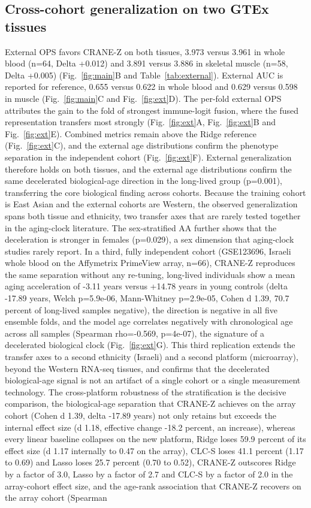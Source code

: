 \documentclass[unnumsec,webpdf,contemporary,large]{oup-authoring-template}
\begin{document}
\subsection{Cross-cohort generalization on two GTEx tissues}\label{sec:res3}
External OPS favors CRANE-Z on both tissues, 3.973 versus 3.961 in whole blood (n=64, Delta +0.012) and 3.891 versus 3.886 in skeletal muscle (n=58, Delta +0.005) (Fig.~\ref{fig:main}B and Table~\ref{tab:external}). External AUC is reported for reference, 0.655 versus 0.622 in whole blood and 0.629 versus 0.598 in muscle (Fig.~\ref{fig:main}C and Fig.~\ref{fig:ext}D). The per-fold external OPS attributes the gain to the fold of strongest immune-logit fusion, where the fused representation transfers most strongly (Fig.~\ref{fig:ext}A, Fig.~\ref{fig:ext}B and Fig.~\ref{fig:ext}E). Combined metrics remain above the Ridge reference (Fig.~\ref{fig:ext}C), and the external age distributions confirm the phenotype separation in the independent cohort (Fig.~\ref{fig:ext}F). External generalization therefore holds on both tissues, and the external age distributions confirm the same decelerated biological-age direction in the long-lived group (p=0.001), transferring the core biological finding across cohorts. Because the training cohort is East Asian and the external cohorts are Western, the observed generalization spans both tissue and ethnicity, two transfer axes that are rarely tested together in the aging-clock literature. The sex-stratified AA further shows that the deceleration is stronger in females (p=0.029), a sex dimension that aging-clock studies rarely report. In a third, fully independent cohort (GSE123696, Israeli whole blood on the Affymetrix PrimeView array, n=66), CRANE-Z reproduces the same separation without any re-tuning, long-lived individuals show a mean aging acceleration of -3.11 years versus +14.78 years in young controls (delta -17.89 years, Welch p=5.9e-06, Mann-Whitney p=2.9e-05, Cohen d 1.39, 70.7 percent of long-lived samples negative), the direction is negative in all five ensemble folds, and the model age correlates negatively with chronological age across all samples (Spearman rho=-0.569, p=4e-07), the signature of a decelerated biological clock (Fig.~\ref{fig:ext}G). This third replication extends the transfer axes to a second ethnicity (Israeli) and a second platform (microarray), beyond the Western RNA-seq tissues, and confirms that the decelerated biological-age signal is not an artifact of a single cohort or a single measurement technology. The cross-platform robustness of the stratification is the decisive comparison, the biological-age separation that CRANE-Z achieves on the array cohort (Cohen d 1.39, delta -17.89 years) not only retains but exceeds the internal effect size (d 1.18, effective change -18.2 percent, an increase), whereas every linear baseline collapses on the new platform, Ridge loses 59.9 percent of its effect size (d 1.17 internally to 0.47 on the array), CLC-S loses 41.1 percent (1.17 to 0.69) and Lasso loses 25.7 percent (0.70 to 0.52), CRANE-Z outscores Ridge by a factor of 3.0, Lasso by a factor of 2.7 and CLC-S by a factor of 2.0 in the array-cohort effect size, and the age-rank association that CRANE-Z recovers on the array cohort (Spearman 
\end{document}
